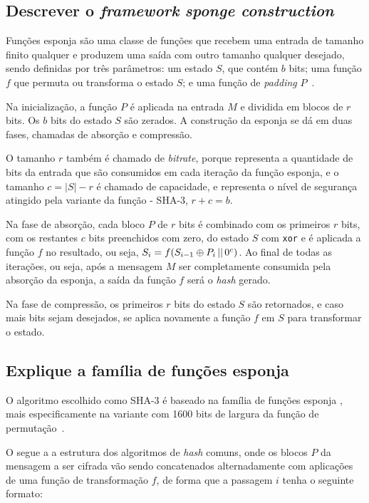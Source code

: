 \subsection{Descrever o \textit{framework} \textit{sponge construction}}

Funções esponja são uma classe de funções que recebem uma entrada de tamanho
finito qualquer e produzem uma saída com outro tamanho qualquer desejado, sendo
definidas por três parâmetros: um estado $S$, que contém $b$ bits; uma função
$f$ que permuta ou transforma o estado $S$; e uma função de \textit{padding}
$P$~\cite{noekeon:2011}.

Na inicialização, a função $P$ é aplicada na entrada $M$ e dividida em blocos
de $r$ bits. Os $b$ bits do estado $S$ são zerados. A construção da esponja se
dá em duas fases, chamadas de absorção e compressão.

O tamanho $r$ também é chamado de \textit{bitrate}, porque representa a
quantidade de bits da entrada que são consumidos em cada iteração da função
esponja, e o tamanho $c = |S| - r$ é chamado de capacidade, e representa o
nível de segurança atingido pela variante da função - SHA-3, $r + c = b$.

Na fase de absorção, cada bloco $P$ de $r$ bits é combinado com os primeiros
$r$ bits, com os restantes $c$ bits preenchidos com zero, do estado $S$ com
\texttt{xor} e é aplicada a função $f$ no resultado, ou seja,
$S_{i} = f(S_{i-1} \oplus P_{i} \operatorname{\lvert\rvert} 0^{c})$. Ao final de todas as
iterações, ou seja, após a mensagem $M$ ser completamente consumida pela
absorção da esponja, a saída da função $f$ será o \textit{hash} gerado.

Na fase de compressão, os primeiros $r$ bits do estado $S$ são retornados, e
caso mais bits sejam desejados, se aplica novamente a função $f$ em $S$ para
transformar o estado.

\subsection{Explique a família de funções esponja \Keccak}

O algoritmo escolhido como SHA-3 é baseado na família de funções esponja
\textbf{\Keccak}, mais especificamente na variante com 1600 bits de largura da
função de permutação~\cite{fips:2015}.

O \Keccak{} segue a a estrutura dos algoritmos de \textit{hash} comuns, onde os
blocos $P$ da mensagem a ser cifrada vão sendo concatenados alternadamente com
aplicações de uma função de transformação $f$, de forma que a passagem $i$
tenha o seguinte formato:


